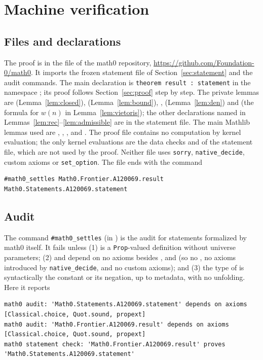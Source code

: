 \documentclass[11pt]{amsart}
\theoremstyle{plain}
\theoremstyle{definition}
\newcommand{\code}[1]{\texttt{#1}}
\begin{document}
\section{Machine verification}\label{sec:lean}

\subsection*{Files and declarations}
The proof is in the file  of the math0 repository, \url{https://github.com/Foundation-0/math0}. It imports the frozen statement file of Section~\ref{sec:statement} and the audit commands. The main declaration is \code{theorem result : statement} in the namespace ; its proof follows Section~\ref{sec:proof} step by step. The private lemmas are  (Lemma~\ref{lem:closed}),  (Lemma~\ref{lem:bound}), ,  (Lemma~\ref{lem:den}) and  (the formula for $w(n)$ in Lemma~\ref{lem:vietoris}); the other declarations named in Lemmas~\ref{lem:rec}--\ref{lem:admissible} are in the statement file. The main Mathlib lemmas used are , , ,  and . The proof file contains no computation by kernel evaluation; the only kernel evaluations are the data checks  and  of the statement file, which are not used by the proof. Neither file uses \texttt{sorry}, \texttt{native\_decide}, custom axioms or \texttt{set\_option}. The file ends with the command
\begin{lstlisting}
#math0_settles Math0.Frontier.A120069.result Math0.Statements.A120069.statement
\end{lstlisting}

\subsection*{Audit}
The command \texttt{\#math0\_settles} (in ) is the audit for statements formalized by math0 itself. It fails unless (1)  is a \texttt{Prop}-valued definition without universe parameters; (2)  and  depend on no axioms besides ,  and  (so no , no axioms introduced by \texttt{native\_decide}, and no custom axioms); and (3) the type of  is syntactically the constant  or its negation, up to metadata, with no unfolding. Here it reports
\begin{lstlisting}[basicstyle=\ttfamily\scriptsize]
math0 audit: 'Math0.Statements.A120069.statement' depends on axioms [Classical.choice, Quot.sound, propext]
math0 audit: 'Math0.Frontier.A120069.result' depends on axioms [Classical.choice, Quot.sound, propext]
math0 statement check: 'Math0.Frontier.A120069.result' proves 'Math0.Statements.A120069.statement'
\end{lstlisting}
\end{document}
